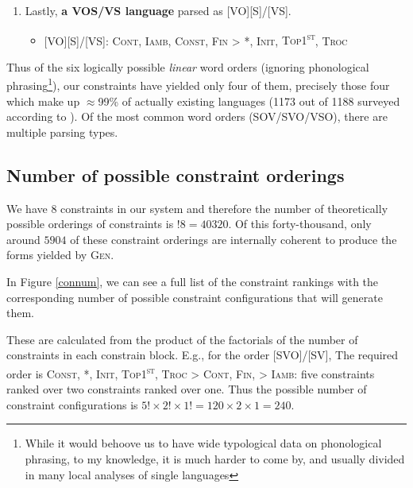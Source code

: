 \documentclass{article}
\newcommand{\cont}{\textsc{Cont}}
\newcommand{\iamb}{\textsc{Iamb}}
\newcommand{\cons}{\textsc{Const}}
\newcommand{\topf}{\textsc{Top1\textsuperscript{st}}}
\newcommand{\nophi}{\textsc{*\textphi}}
\newcommand{\finphi}{\textsc{Fin\textphi}}
\newcommand{\initphi}{\textsc{Init\textphi}}
\newcommand{\troc}{\textsc{Troc}}
\begin{document}
\begin{enumerate}
\begin{itemize}
\item {}[VS][O]/[VS]: \cont, \iamb, \finphi, {\topf} {\textgreater} \cons, \nophi, \initphi, \troc
\item {}[VSO]/[VS]: \iamb, \cons, \nophi, \finphi, {\topf} {\textgreater} \cont, \initphi, \troc
\end{itemize}

\item Lastly, \textbf{a VOS/VS language} parsed as [VO][S]/[VS].

\begin{itemize}
\item {}[VO][S]/[VS]: \cont, \iamb, \cons, {\finphi} {\textgreater} \nophi, \initphi, \topf, \troc
\end{itemize}

\end{enumerate}

Thus of the six logically possible \emph{linear} word orders (ignoring phonological phrasing\footnote{While it would behoove us to have wide typological data on phonological phrasing, to my knowledge, it is much harder to come by, and usually divided in many local analyses of single languages}), our constraints have yielded only four of them, precisely those four which make up $\approx$99\% of actually existing languages (1173 out of 1188 surveyed according to \textcite{dryer13}).
Of the most common word orders (SOV/SVO/VSO), there are multiple parsing types.

\subsection{Number of possible constraint orderings}

We have 8 constraints in our system and therefore the number of theoretically possible orderings of constraints is $!8 = 40320$. Of this forty-thousand, only around $5904$ of these constraint orderings are internally coherent to produce the forms yielded by \textsc{Gen}.

In Figure \ref{connum}, we can see a full list of the constraint rankings with the corresponding number of possible constraint configurations that will generate them.

These are calculated from the product of the factorials of the number of constraints in each constrain block.
E.g., for the order
[SVO]/[SV],
The required order is \cons, \nophi, \initphi, \topf, {\troc} {\textgreater} \cont, {\finphi,} {\textgreater} \iamb: five constraints ranked over two constraints ranked over one. Thus the possible number of constraint configurations is $5! \times 2! \times 1! = 120 \times 2 \times 1 = 240$.
\end{document}
